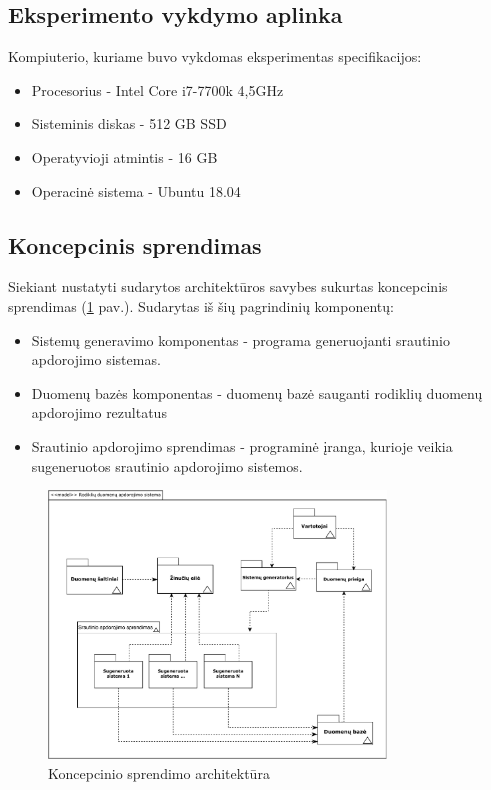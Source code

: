 \documentclass{VUMIFPSbakalaurinis}
\begin{document}
\subsection{Eksperimento vykdymo aplinka}

Kompiuterio, kuriame buvo vykdomas eksperimentas specifikacijos:
\begin{itemize}
    \item Procesorius - Intel Core i7-7700k 4,5GHz
    \item Sisteminis diskas -  512 GB SSD
    \item Operatyvioji atmintis - 16 GB 
    \item Operacinė sistema - Ubuntu 18.04
\end{itemize}

\subsection{Koncepcinis sprendimas}

Siekiant nustatyti sudarytos architektūros savybes sukurtas koncepcinis sprendimas (\ref{img:concept} pav.). Sudarytas iš šių pagrindinių komponentų:
\begin{itemize}
    \item Sistemų generavimo komponentas - programa generuojanti srautinio apdorojimo sistemas.
    \item Duomenų bazės komponentas - duomenų bazė sauganti rodiklių duomenų apdorojimo rezultatus
    \item Srautinio apdorojimo sprendimas - programinė įranga, kurioje veikia sugeneruotos srautinio apdorojimo sistemos.
\end{itemize}

\begin{figure}[H]
    \centering
    \includegraphics[width=0.8\textwidth]{img/architekturos_diagrama.pdf}
    \caption{Koncepcinio sprendimo architektūra}
    \label{img:concept}
\end{figure}
\end{document}
